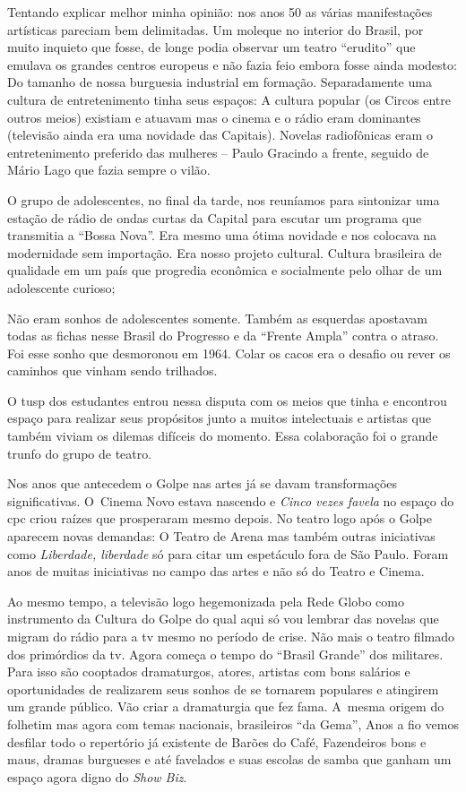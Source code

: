 Tentando explicar melhor minha opinião: nos anos 50 as várias
manifestações artísticas pareciam bem delimitadas. Um moleque no
interior do Brasil, por muito inquieto que fosse, de longe podia
observar um teatro “erudito” que emulava os grandes centros europeus e
não fazia feio embora fosse ainda modesto: Do tamanho de nossa burguesia
industrial em formação. Separadamente uma cultura de entretenimento
tinha seus espaços: A cultura popular (os Circos entre outros meios)
existiam e atuavam mas o cinema e o rádio eram dominantes (televisão
ainda era uma novidade das Capitais). Novelas radiofônicas eram o
entretenimento preferido das mulheres -- Paulo Gracindo a frente,
seguido de Mário Lago que fazia sempre o vilão.

O grupo de adolescentes, no final da tarde, nos reuníamos para
sintonizar uma estação de rádio de ondas curtas da Capital para escutar
um programa que transmitia a “Bossa Nova”. Era mesmo uma ótima novidade
e nos colocava na modernidade sem importação. Era nosso projeto
cultural. Cultura brasileira de qualidade em um país que progredia
econômica e socialmente pelo olhar de um adolescente curioso;

Não eram sonhos de adolescentes somente. Também as esquerdas apostavam
todas as fichas nesse Brasil do Progresso e da “Frente Ampla” contra o
atraso. Foi esse sonho que desmoronou em 1964. Colar os cacos era o
desafio ou rever os caminhos que vinham sendo trilhados.

O {\sc tusp} dos estudantes entrou nessa disputa com os meios que tinha e
encontrou espaço para realizar seus propósitos junto a muitos
intelectuais e artistas que também viviam os dilemas difíceis do
momento. Essa colaboração foi o grande trunfo do grupo de teatro.

Nos anos que antecedem o Golpe nas artes já se davam transformações
significativas. O~Cinema Novo estava nascendo e {\it Cinco vezes favela}
no espaço do {\sc cpc} criou raízes que prosperaram mesmo depois. No teatro
logo após o Golpe aparecem novas demandas: O Teatro de Arena mas também
outras iniciativas como {\it Liberdade, liberdade} só para citar um
espetáculo fora de São Paulo. Foram anos de muitas iniciativas no campo
das artes e não só do Teatro e Cinema.

Ao mesmo tempo, a televisão logo hegemonizada pela Rede Globo como
instrumento da Cultura do Golpe do qual aqui só vou lembrar das novelas
que migram do rádio para a {\sc tv} mesmo no período de crise. Não mais o
teatro filmado dos primórdios da {\sc tv}. Agora começa o tempo do “Brasil
Grande” dos militares. Para isso são cooptados dramaturgos, atores,
artistas com bons salários e oportunidades de realizarem seus sonhos de
se tornarem populares e atingirem um grande público. Vão criar a
dramaturgia que fez fama. A~mesma origem do folhetim mas agora com temas
nacionais, brasileiros “da Gema”, Anos a fio vemos desfilar todo o
repertório já existente de Barões do Café, Fazendeiros bons e maus,
dramas burgueses e até favelados e suas escolas de samba que ganham um
espaço agora digno do {\it Show Biz}.

